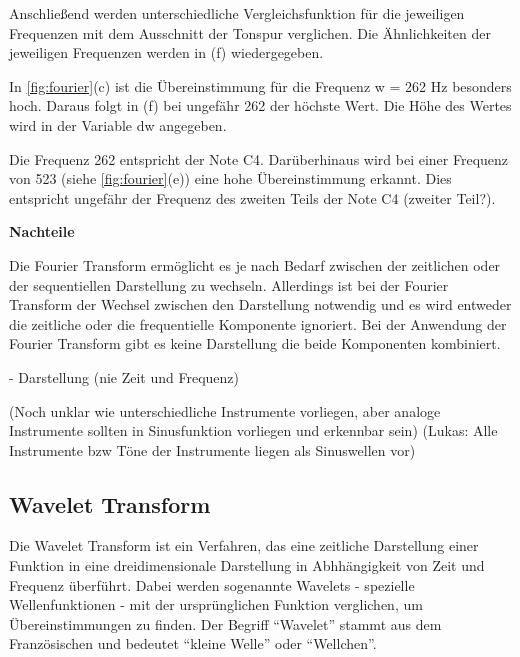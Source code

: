 Anschließend werden unterschiedliche Vergleichsfunktion für die jeweiligen Frequenzen mit dem Ausschnitt der Tonspur verglichen. Die Ähnlichkeiten der jeweiligen Frequenzen werden in (f) wiedergegeben.

\par

In \cref{fig:fourier}(c) ist die Übereinstimmung für die Frequenz w = 262 Hz besonders hoch. Daraus folgt in (f) bei ungefähr 262 der höchste Wert. Die Höhe des Wertes wird in der Variable dw angegeben.


\par

Die Frequenz 262 entspricht der Note C4. Darüberhinaus wird bei einer Frequenz von 523 (siehe \cref{fig:fourier}(e)) eine hohe Übereinstimmung erkannt. Dies entspricht ungefähr der Frequenz des zweiten Teils der Note C4 (zweiter Teil?).

%
\textbf{Nachteile}
%
    
Die Fourier Transform ermöglicht es je nach Bedarf zwischen der zeitlichen oder der sequentiellen Darstellung zu wechseln. Allerdings ist bei der Fourier Transform der Wechsel zwischen den Darstellung notwendig und es wird entweder die zeitliche oder die frequentielle Komponente ignoriert. Bei der Anwendung der Fourier Transform gibt es keine Darstellung die beide Komponenten kombiniert.

    - Darstellung (nie Zeit und Frequenz)

(Noch unklar wie unterschiedliche Instrumente vorliegen, aber analoge Instrumente sollten in Sinusfunktion vorliegen und erkennbar sein)
(Lukas: Alle Instrumente bzw Töne der Instrumente liegen als Sinuswellen vor)

%
\subsection{Wavelet Transform}
\label{wavelet-transformation}
%

Die Wavelet Transform ist ein Verfahren, das eine zeitliche Darstellung einer Funktion in eine dreidimensionale Darstellung in Abhhängigkeit von Zeit und Frequenz überführt. Dabei werden sogenannte Wavelets - spezielle Wellenfunktionen - mit der ursprünglichen Funktion verglichen, um Übereinstimmungen zu finden. Der Begriff \enquote{Wavelet} stammt aus dem Französischen und bedeutet \enquote{kleine Welle} oder \enquote{Wellchen}.

\par

